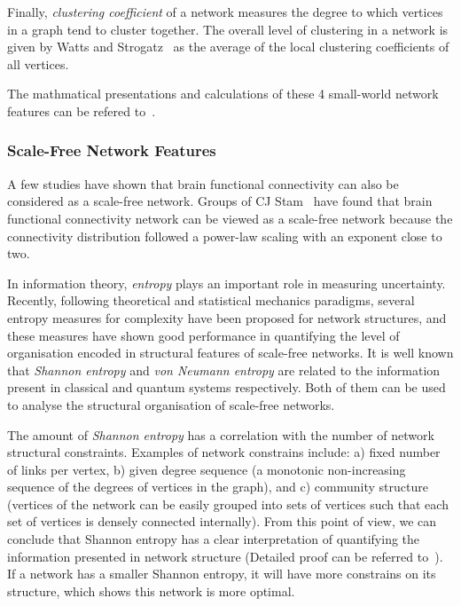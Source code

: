 Finally, \emph{clustering coefficient} of a network measures the degree to which vertices in a graph tend to cluster together. The overall level of clustering in a network is given by Watts and Strogatz~\cite{watts1998collective} as the average of the local clustering coefficients of all vertices. 

The mathmatical presentations and calculations of these 4 small-world network features can be refered to~\cite{rubinov2010complex}.

\subsubsection{Scale-Free Network Features}
A few studies have shown that brain functional connectivity can also be considered as a scale-free network. Groups of CJ Stam~\cite{stam2004functional} have found that brain functional connectivity network can be viewed as a scale-free network because the connectivity distribution followed a power-law scaling with an exponent close to two.

In information theory, \emph{entropy} plays an important role in measuring uncertainty. Recently, following theoretical and statistical mechanics paradigms, several entropy measures for complexity have been proposed for network structures, and these measures have shown good performance in quantifying the level of organisation encoded in structural features of scale-free networks. It is well known that \emph{Shannon entropy} and \emph{von Neumann entropy} are related to the information present in classical and quantum systems respectively. Both of them can be used to analyse the structural organisation of scale-free networks\cite{anand2009entropy}. 

The amount of \emph{Shannon entropy} has a correlation with the number of network structural constraints. Examples of network constrains include: a) fixed number of links per vertex, b) given degree sequence (a monotonic non-increasing sequence of the degrees of vertices in the graph), and c) community structure (vertices of the network can be easily grouped into sets of vertices such that each set of vertices is densely connected internally). From this point of view, we can conclude that Shannon entropy has a clear interpretation of quantifying the information presented in network structure (Detailed proof can be referred to~\cite{anand2009entropy}). If a network has a smaller Shannon entropy, it will have more constrains on its structure, which shows this network is more optimal. 

